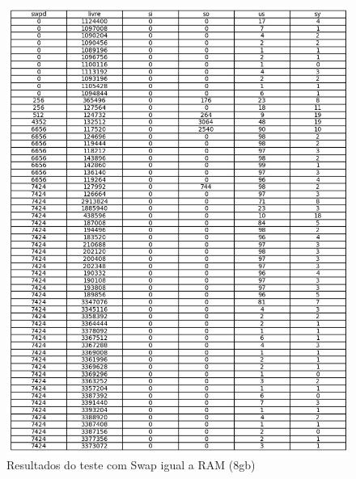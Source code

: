 \documentclass[
	12pt,				%
	openright,			%
	oneside,			%
	a4paper,			%
	chapter=TITLE,		%
	english,			%
	french,				%
	spanish,			%
	brazil				%
	]{abntex2}
\theoremstyle{definition}
\begin{document}
\begin{figure}[H]
	\centering
	\includegraphics[width=1.0\textwidth]{swap8gb.png}
	\caption{Resultados do teste com Swap igual a RAM (8gb)}
	\label{fig:swap8}
\end{figure}
\end{document}
